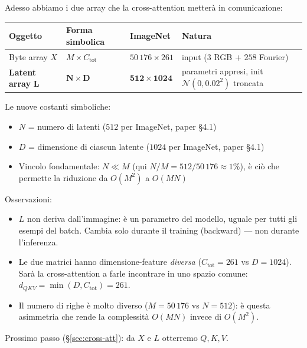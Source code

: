 \documentclass[
  11pt,
]{article}
\begin{document}
\begin{notabox}[title={\textbf{Checkpoint dimensioni --- fine \S1.4.4}}]
Adesso abbiamo i due array che la cross-attention metterà in comunicazione:

\medskip
\begin{center}
\begin{tabular}{@{}llll@{}}
\toprule
\textbf{Oggetto} & \textbf{Forma simbolica} & \textbf{ImageNet} & \textbf{Natura} \\
\midrule
Byte array $X$ & $M \times C_{\text{tot}}$ & $50\,176 \times 261$ & input ($3$ RGB $+$ $258$ Fourier) \\
\textbf{Latent array} $\boldsymbol{L}$ & $\boldsymbol{N \times D}$ & $\mathbf{512 \times 1024}$ & parametri appresi, init $\mathcal{N}(0, 0.02^2)$ troncata \\
\bottomrule
\end{tabular}
\end{center}

\medskip
Le nuove costanti simboliche:
\begin{itemize}\setlength\itemsep{0.1em}
\item $N$ = numero di latenti ($512$ per ImageNet, paper §4.1)
\item $D$ = dimensione di ciascun latente ($1024$ per ImageNet, paper §4.1)
\item Vincolo fondamentale: $N \ll M$ (qui $N/M = 512/50\,176 \approx 1\%$), è ciò che permette la riduzione da $O(M^2)$ a $O(MN)$
\end{itemize}

\medskip
Osservazioni:
\begin{itemize}\setlength\itemsep{0.1em}
\item $L$ non deriva dall'immagine: è un parametro del modello, uguale per tutti gli esempi del batch. Cambia solo durante il training (backward) --- non durante l'inferenza.
\item Le due matrici hanno dimensione-feature \emph{diversa} ($C_{\text{tot}}=261$ vs $D=1024$). Sarà la cross-attention a farle incontrare in uno spazio comune: $d_{QKV} = \min(D, C_{\text{tot}}) = 261$.
\item Il numero di righe è molto diverso ($M = 50\,176$ vs $N = 512$): è questa asimmetria che rende la complessità $O(MN)$ invece di $O(M^2)$.
\end{itemize}

\medskip
Prossimo passo (\S\ref{sec:cross-att}): da $X$ e $L$ otterremo $Q, K, V$.
\end{notabox}
\end{document}
